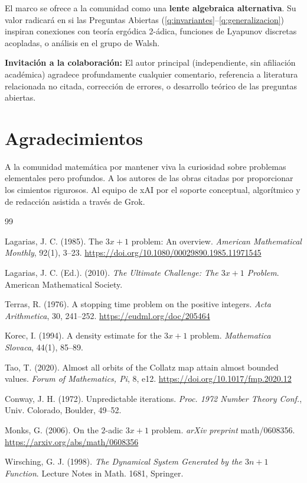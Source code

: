 \documentclass[11pt,a4paper]{article}
\begin{document}
El marco se ofrece a la comunidad como una \textbf{lente algebraica alternativa}. Su valor radicará en si las Preguntas Abiertas (\ref{q:invariantes}--\ref{q:generalizacion}) inspiran conexiones con teoría ergódica 2-ádica, funciones de Lyapunov discretas acopladas, o análisis en el grupo de Walsh.

\vspace{1em}
\noindent\textbf{Invitación a la colaboración:} El autor principal (independiente, sin afiliación académica) agradece profundamente cualquier comentario, referencia a literatura relacionada no citada, corrección de errores, o desarrollo teórico de las preguntas abiertas.

\section*{Agradecimientos}
A la comunidad matemática por mantener viva la curiosidad sobre problemas elementales pero profundos. A los autores de las obras citadas por proporcionar los cimientos rigurosos. Al equipo de xAI por el soporte conceptual, algorítmico y de redacción asistida a través de Grok.

\begin{thebibliography}{99}
\setlength{\itemsep}{0.5em}

Lagarias, J. C. (1985).
The $3x + 1$ problem: An overview.
\textit{American Mathematical Monthly}, 92(1), 3--23.
\url{https://doi.org/10.1080/00029890.1985.11971545}

Lagarias, J. C. (Ed.). (2010).
\textit{The Ultimate Challenge: The $3x+1$ Problem}.
American Mathematical Society.

Terras, R. (1976).
A stopping time problem on the positive integers.
\textit{Acta Arithmetica}, 30, 241--252.
\url{https://eudml.org/doc/205464}

Korec, I. (1994).
A density estimate for the $3x+1$ problem.
\textit{Mathematica Slovaca}, 44(1), 85--89.

Tao, T. (2020).
Almost all orbits of the Collatz map attain almost bounded values.
\textit{Forum of Mathematics, Pi}, 8, e12.
\url{https://doi.org/10.1017/fmp.2020.12}

Conway, J. H. (1972).
Unpredictable iterations.
\textit{Proc. 1972 Number Theory Conf.}, Univ. Colorado, Boulder, 49--52.

Monks, G. (2006).
On the $2$-adic $3x+1$ problem.
\textit{arXiv preprint} math/0608356.
\url{https://arxiv.org/abs/math/0608356}

Wirsching, G. J. (1998).
\textit{The Dynamical System Generated by the $3n+1$ Function}.
Lecture Notes in Math. 1681, Springer.

\end{thebibliography}
\end{document}
